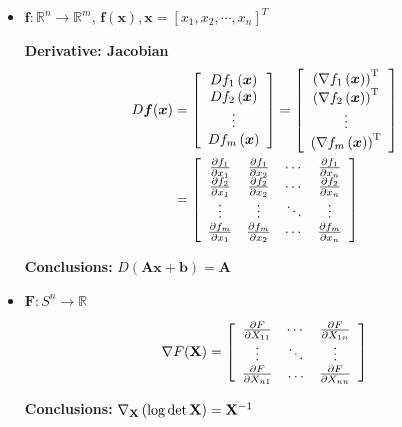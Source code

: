 \begin{itemize}
\item $\bm{f}: \mathbb{R}^{n} \rightarrow \mathbb{R}^{m}$, $\bm{f}(\boldsymbol{x}), \boldsymbol{x}=\left[x_{1}, x_{2}, \cdots, x_{n}\right]^{T}$

\textbf{Derivative: Jacobian}
\begin{align*}
D\bm{f}({\bm{x}}) 
&= \left[ {\begin{array}{*{20}{c}}
{D{f_1}\left( {\bm{x}} \right)}\\
{D{f_2}\left( {\bm{x}} \right)}\\
 \vdots \\
{D{f_m}\left( {\bm{x}} \right)}
\end{array}} \right] = \left[ {\begin{array}{*{20}{c}}
{{{\left( {\nabla {f_1}\left( {\bm{x}} \right)} \right)}^{\rm{T}}}}\\
{{{\left( {\nabla {f_2}\left( {\bm{x}} \right)} \right)}^{\rm{T}}}}\\
 \vdots \\
{{{\left( {\nabla {f_m}\left( {\bm{x}} \right)} \right)}^{\rm{T}}}}
\end{array}} \right]\\
& = \left[ {\begin{array}{*{20}{c}}
{\frac{{\partial {f_1}}}{{\partial {x_1}}}}&{\frac{{\partial {f_1}}}{{\partial {x_2}}}}& \cdots &{\frac{{\partial {f_1}}}{{\partial {x_n}}}}\\
{\frac{{\partial {f_2}}}{{\partial {x_1}}}}&{\frac{{\partial {f_2}}}{{\partial {x_2}}}}& \cdots &{\frac{{\partial {f_2}}}{{\partial {x_n}}}}\\
 \vdots & \vdots & \ddots & \vdots \\
{\frac{{\partial {f_m}}}{{\partial {x_1}}}}&{\frac{{\partial {f_m}}}{{\partial {x_2}}}}& \cdots &{\frac{{\partial {f_m}}}{{\partial {x_n}}}}
\end{array}} \right]    
\end{align*}


\textbf{Conclusions:} $D(\bm{A}\bm{x}+\bm{b})=\bm{A}$



\item $\bm{F}: {S}^{n} \rightarrow \mathbb{R}$

\[\nabla F({\bf{X}}) = \left[ {\begin{array}{*{20}{c}}
{\frac{{\partial F}}{{\partial {X_{11}}}}}& \cdots &{\frac{{\partial F}}{{\partial {X_{1n}}}}}\\
 \vdots & \ddots & \vdots \\
{\frac{{\partial F}}{{\partial {X_{n1}}}}}& \ldots &{\frac{{\partial F}}{{\partial {X_{nn}}}}}
\end{array}} \right]\]

\textbf{Conclusions:} ${\nabla _{\bf{X}}}\left( {\log \det {\bf{X}}} \right) = {{\bf{X}}^{ - 1}}$

\end{itemize}



